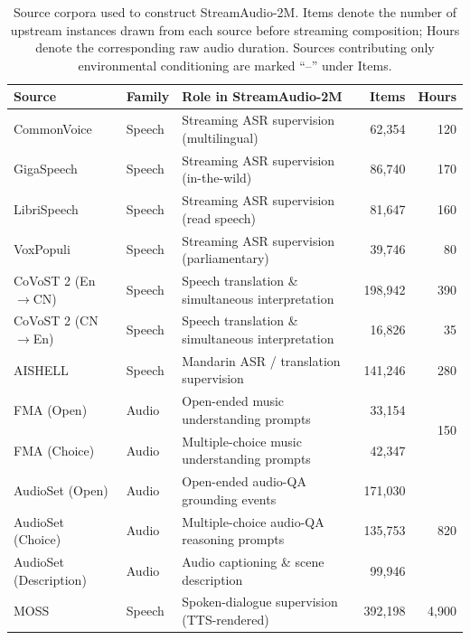 \documentclass{article}
\begin{document}
\begin{table}[h]
\centering
\caption{Source corpora used to construct StreamAudio-2M. Items denote the number of
upstream instances drawn from each source before streaming composition; Hours denote the
corresponding raw audio duration. Sources contributing only environmental conditioning
are marked ``--'' under Items.}
\label{tab:app:sources}
\small
\setlength{\tabcolsep}{4pt}
\renewcommand{\arraystretch}{1.05}
\begin{tabularx}{\linewidth}{@{}l l X r r@{}}
\toprule
\textbf{Source} & \textbf{Family} & \textbf{Role in StreamAudio-2M} & \textbf{Items} & \textbf{Hours} \\
\midrule
CommonVoice           & Speech         & Streaming ASR supervision (multilingual)          & 62{,}354  & 120 \\
GigaSpeech            & Speech         & Streaming ASR supervision (in-the-wild)           & 86{,}740  & 170 \\
LibriSpeech           & Speech         & Streaming ASR supervision (read speech)           & 81{,}647  & 160 \\
VoxPopuli             & Speech         & Streaming ASR supervision (parliamentary)         & 39{,}746  & 80  \\
\midrule
CoVoST 2 (En$\to$CN)  & Speech         & Speech translation \& simultaneous interpretation & 198{,}942 & 390 \\
CoVoST 2 (CN$\to$En)  & Speech         & Speech translation \& simultaneous interpretation & 16{,}826  & 35  \\
AISHELL               & Speech         & Mandarin ASR / translation supervision            & 141{,}246 & 280 \\
\midrule
FMA (Open)            & Audio          & Open-ended music understanding prompts            & 33{,}154  & \multirow{2}{*}{150} \\
FMA (Choice)          & Audio          & Multiple-choice music understanding prompts       & 42{,}347  &     \\
AudioSet (Open)       & Audio          & Open-ended audio-QA grounding events              & 171{,}030 & \multirow{3}{*}{820} \\
AudioSet (Choice)     & Audio          & Multiple-choice audio-QA reasoning prompts        & 135{,}753 &     \\
AudioSet (Description)& Audio          & Audio captioning \& scene description             & 99{,}946  &     \\
\midrule
MOSS                  & Speech         & Spoken-dialogue supervision (TTS-rendered)        & 392{,}198 & 4{,}900 \\

\end{tabularx}
\end{table}
\end{document}
